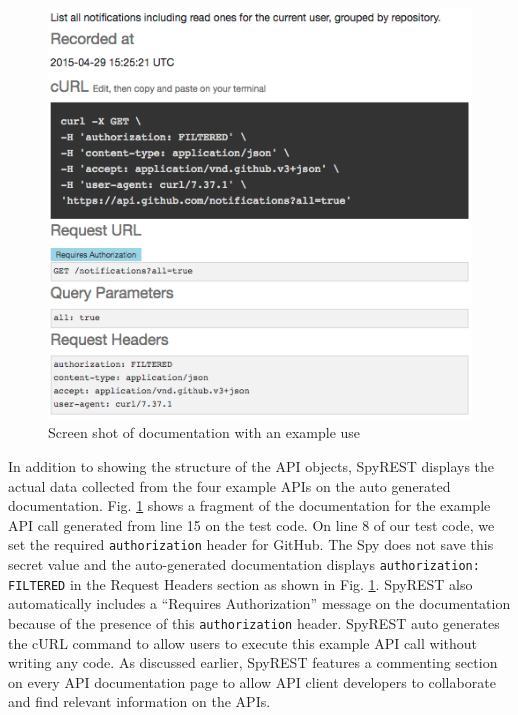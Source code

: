 \documentclass[conference]{IEEEtran}
\begin{document}
\begin{figure}[!tbh]
  \centering
  \includegraphics[width=\linewidth]{notification_example.png}
  \caption{Screen shot of documentation with an example use}
  \label{fig:notification_example}
\end{figure}

In addition to showing the structure of the API objects, SpyREST displays the actual data collected from the four example APIs on the auto generated documentation. Fig. \ref{fig:notification_example} shows a fragment of the documentation for the example API call generated from line 15 on the test code. On line 8 of our test code, we set the required \texttt{authorization} header for GitHub. The Spy does not save this secret value and the auto-generated documentation displays \texttt{authorization: FILTERED} in the Request Headers section as shown in Fig. \ref{fig:notification_example}. SpyREST also automatically includes a ``Requires Authorization'' message on the documentation because of the presence of this \texttt{authorization} header. SpyREST auto generates the cURL command to allow users to execute this example API call without writing any code. As discussed earlier, SpyREST features a commenting section on every API documentation page to allow API client developers to collaborate and find relevant information on the APIs.
\end{document}
